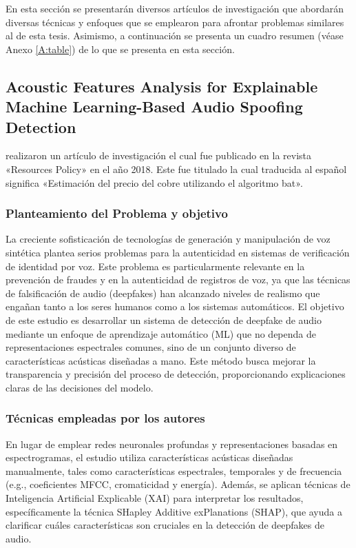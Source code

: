 En esta sección se presentarán diversos artículos de investigación que abordarán diversas técnicas y enfoques que se emplearon para afrontar problemas similares al de esta tesis. Asimismo, a continuación se presenta un cuadro resumen (véase Anexo \ref{A:table}) de lo que se presenta en esta sección.


\subsection{Acoustic Features Analysis for Explainable Machine Learning-Based Audio Spoofing Detection \citep*{pr_dehghani2018copper}}
\citeauthor{pr_dehghani2018copper} realizaron un artículo de investigación el cual fue publicado en la revista «Resources Policy» en el año 2018. Este fue titulado  la cual traducida al español significa «Estimación del precio del cobre utilizando el algoritmo bat».

\subsubsection{Planteamiento del Problema y objetivo }
La creciente sofisticación de tecnologías de generación y manipulación de voz sintética plantea serios problemas para la autenticidad en sistemas de verificación de identidad por voz. Este problema es particularmente relevante en la prevención de fraudes y en la autenticidad de registros de voz, ya que las técnicas de falsificación de audio (deepfakes) han alcanzado niveles de realismo que engañan tanto a los seres humanos como a los sistemas automáticos. El objetivo de este estudio es desarrollar un sistema de detección de deepfake de audio mediante un enfoque de aprendizaje automático (ML) que no dependa de representaciones espectrales comunes, sino de un conjunto diverso de características acústicas diseñadas a mano. Este método busca mejorar la transparencia y precisión del proceso de detección, proporcionando explicaciones claras de las decisiones del modelo.

\subsubsection{Técnicas empleadas por los autores}
En lugar de emplear redes neuronales profundas y representaciones basadas en espectrogramas, el estudio utiliza características acústicas diseñadas manualmente, tales como características espectrales, temporales y de frecuencia (e.g., coeficientes MFCC, cromaticidad y energía). Además, se aplican técnicas de Inteligencia Artificial Explicable (XAI) para interpretar los resultados, específicamente la técnica SHapley Additive exPlanations (SHAP), que ayuda a clarificar cuáles características son cruciales en la detección de deepfakes de audio. 

